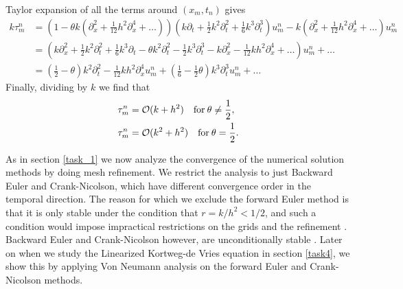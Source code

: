 Taylor expansion of all the terms around $(x_m, t_n)$ gives
\begin{align*}
    k\tau_m^n & = \left(1-\theta k(\partial_x^2+\frac{1}{12}h^2\partial_x^4+\dots) \right)
    \left(k\partial_t+\frac{1}{2}k^2\partial_t^2+\frac{1}{6}k^3\partial_t^3\right)u_m^n
    -k\left(\partial_x^2+\frac{1}{12}h^2\partial_x^4+\dots\right)u_m^n\\
    & = \left(k\partial_x^2+\frac{1}{2}k^2\partial_t^2+\frac{1}{6}k^3\partial_t
    -\theta k^2 \partial_t^2 - \frac{1}{2} k^3 \partial_t^3 - k \partial_x^2 - \frac{1}{12} kh^2 \partial_x^4 + \dots \right)u_m^n + \dots\\
    & = (\frac{1}{2}-\theta)k^2\partial_t^2-\frac{1}{12}kh^2\partial_x^4u_m^n+(\frac{1}{6}-\frac{1}{2}\theta)k^3\partial_t^3u_m^n+\dots
\end{align*}
Finally, dividing by $k$ we find that 
\begin{align*}
    \tau_m^n & = \mathcal{O}(k+h^2) \quad \text{for} \: \theta\neq\frac{1}{2},\\
    \tau_m^n & = \mathcal{O}(k^2+h^2) \quad \text{for} \: \theta = \frac{1}{2}.
\end{align*}

As in section \ref{task_1} we now analyze the convergence of the numerical solution methods 
by doing mesh refinement. 
We restrict the analysis to just Backward Euler and Crank-Nicolson, 
which have different convergence order in the temporal direction. 
The reason for which we exclude the forward Euler method is that it is only stable under the condition that $r=k/h^2 < 1/2$, 
and such a condition would impose impractical restrictions on the grids and the refinement \cite{owren}. 
Backward Euler and Crank-Nicolson however, are unconditionally stable \cite{owren}. 
Later on when we study the Linearized Kortweg-de Vries equation in section \ref{task4}, 
we show this by applying Von Neumann analysis on the forward Euler and Crank-Nicolson methods. 

